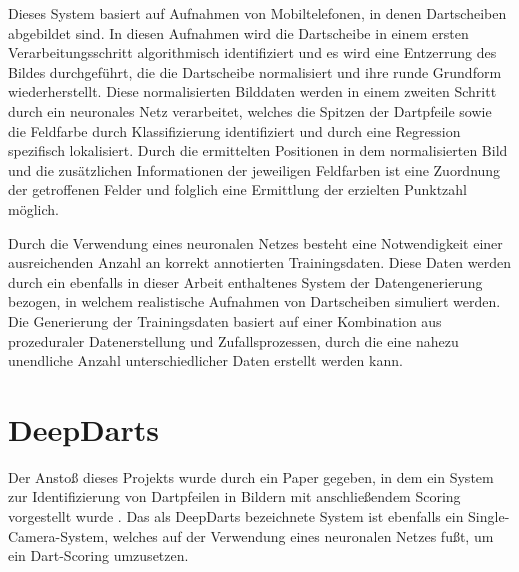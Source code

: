 Dieses System basiert auf Aufnahmen von Mobiltelefonen, in denen Dartscheiben abgebildet sind. In diesen Aufnahmen wird die Dartscheibe in einem ersten Verarbeitungsschritt algorithmisch identifiziert und es wird eine Entzerrung des Bildes durchgeführt, die die Dartscheibe normalisiert und ihre runde Grundform wiederherstellt. Diese normalisierten Bilddaten werden in einem zweiten Schritt durch ein neuronales Netz verarbeitet, welches die Spitzen der Dartpfeile sowie die Feldfarbe durch Klassifizierung identifiziert und durch eine Regression spezifisch lokalisiert. Durch die ermittelten Positionen in dem normalisierten Bild und die zusätzlichen Informationen der jeweiligen Feldfarben ist eine Zuordnung der getroffenen Felder und folglich eine Ermittlung der erzielten Punktzahl möglich.

Durch die Verwendung eines neuronalen Netzes besteht eine Notwendigkeit einer ausreichenden Anzahl an korrekt annotierten Trainingsdaten. Diese Daten werden durch ein ebenfalls in dieser Arbeit enthaltenes System der Datengenerierung bezogen, in welchem realistische Aufnahmen von Dartscheiben simuliert werden. Die Generierung der Trainingsdaten basiert auf einer Kombination aus prozeduraler Datenerstellung und Zufallsprozessen, durch die eine nahezu unendliche Anzahl unterschiedlicher Daten erstellt werden kann.



\section{DeepDarts}
\label{sec:deepdarts}

Der Anstoß dieses Projekts wurde durch ein Paper gegeben, in dem ein System zur Identifizierung von Dartpfeilen in Bildern mit anschließendem Scoring vorgestellt wurde \cite{deepdarts}. Das als DeepDarts bezeichnete System ist ebenfalls ein Single-Camera-System, welches auf der Verwendung eines neuronalen Netzes fußt, um ein Dart-Scoring umzusetzen.

